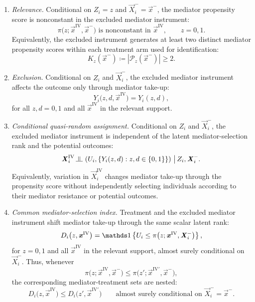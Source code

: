 \begin{enumerate}[label=\textbf{(\arabic*)}]

    \item \emph{Relevance.}
    Conditional on $Z_i=z$ and $\vec X_i^-=\vec x^-$, the mediator propensity score is nonconstant in the excluded mediator instrument:
    \[
        \pi\big(z;\vec x^{\mathrm{IV}},\vec x^-\big)
        \text{ is nonconstant in }
        \vec x^{\mathrm{IV}},
        \qquad
        z=0,1.
    \]
    Equivalently, the excluded instrument generates at least two distinct mediator propensity scores within each treatment arm used for identification:
    \[
        K_z(\vec x^-)
        \coloneqq
        \left|
            \mathcal P_z(\vec x^-)
        \right|
        \geq 2.
    \]

    \item \emph{Exclusion.}
    Conditional on $Z_i$ and $\vec X_i^-$, the excluded mediator instrument affects the outcome only through mediator take-up:
    \[
        Y_i
        \big(
            z,d,\vec x^{\mathrm{IV}}
        \big)
        =
        Y_i(z,d),
    \]
    for all $z,d=0,1$ and all $\vec x^{\mathrm{IV}}$ in the relevant support.

    \item \emph{Conditional quasi-random assignment.}
    Conditional on $Z_i$ and $\vec X_i^-$, the excluded mediator instrument is independent of the latent mediator-selection rank and the potential outcomes:
    \[
        \vec X_i^{\mathrm{IV}}
        \indep
        \left(
            U_i,
            \left\{
                Y_i(z,d):
                z,d\in\{0,1\}
            \right\}
        \right)
        \,\big|\,
        Z_i,\vec X_i^-.
    \]
    Equivalently, variation in $\vec X_i^{\mathrm{IV}}$ changes mediator take-up through the propensity score without independently selecting individuals according to their mediator resistance or potential outcomes.

    \item \emph{Common mediator-selection index.}
    Treatment and the excluded mediator instrument shift mediator take-up through the same scalar latent rank:
    \[
        D_i
        \big(
            z,\vec x^{\mathrm{IV}}
        \big)
        =
        \indicator{
            U_i
            \leq
            \pi
            \big(
                z;
                \vec x^{\mathrm{IV}},
                \vec X_i^-
            \big)
        },
    \]
    for $z=0,1$ and all $\vec x^{\mathrm{IV}}$ in the relevant support, almost surely conditional on $\vec X_i^-$.
    Thus, whenever
    \[
        \pi
        \big(
            z;
            \vec x^{\mathrm{IV}},
            \vec x^-
        \big)
        \leq
        \pi
        \big(
            z';
            \vec x^{\mathrm{IV}\prime},
            \vec x^-
        \big),
    \]
    the corresponding mediator-treatment sets are nested:
    \[
        D_i
        \big(
            z,\vec x^{\mathrm{IV}}
        \big)
        \leq
        D_i
        \big(
            z',\vec x^{\mathrm{IV}\prime}
        \big)
        \qquad
        \text{almost surely conditional on }
        \vec X_i^-=\vec x^-.
    \]


\end{enumerate}
